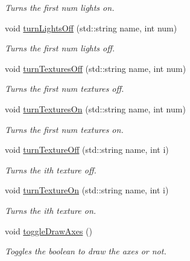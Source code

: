 \begin{DoxyCompactItemize}
\begin{DoxyCompactList}\small\item\em Turns the first num lights on. \end{DoxyCompactList}\item 
void \hyperlink{class_graphics_engine_adc787f919c16eda96ec6709f669ee718}{turn\+Lights\+Off} (std\+::string name, int num)
\begin{DoxyCompactList}\small\item\em Turns the first num lights off. \end{DoxyCompactList}\item 
void \hyperlink{class_graphics_engine_a13a43684e7a53ff0c39b7ef014a8d121}{turn\+Textures\+Off} (std\+::string name, int num)
\begin{DoxyCompactList}\small\item\em Turns the first num textures off. \end{DoxyCompactList}\item 
void \hyperlink{class_graphics_engine_a93d13fafc47d86e42a2d62b874af152d}{turn\+Textures\+On} (std\+::string name, int num)
\begin{DoxyCompactList}\small\item\em Turns the first num textures on. \end{DoxyCompactList}\item 
void \hyperlink{class_graphics_engine_a26a9223f0a99980ca872a3dc0ab940e4}{turn\+Texture\+Off} (std\+::string name, int i)
\begin{DoxyCompactList}\small\item\em Turns the ith texture off. \end{DoxyCompactList}\item 
void \hyperlink{class_graphics_engine_a87f26e8a7fb01b6e317ced365cda1e80}{turn\+Texture\+On} (std\+::string name, int i)
\begin{DoxyCompactList}\small\item\em Turns the ith texture on. \end{DoxyCompactList}\item 
\mbox{\label{class_graphics_engine_a5e58164b2274911a7f7d0f963195a558}} 
void \hyperlink{class_graphics_engine_a5e58164b2274911a7f7d0f963195a558}{toggle\+Draw\+Axes} ()
\begin{DoxyCompactList}\small\item\em Toggles the boolean to draw the axes or not. \end{DoxyCompactList}\item 

\end{DoxyCompactItemize}
